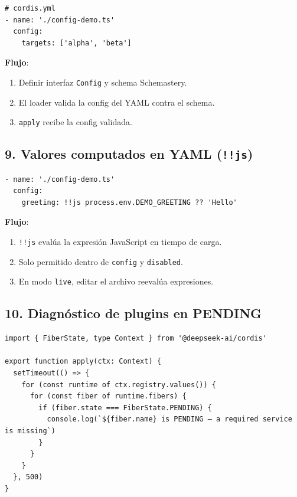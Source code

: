 \documentclass[11pt,a4paper]{article}
\begin{document}
\begin{lstlisting}
# cordis.yml
- name: './config-demo.ts'
  config:
    targets: ['alpha', 'beta']
\end{lstlisting}


\textbf{Flujo}:


\begin{enumerate}[leftmargin=*,topsep=2pt,itemsep=1pt]
  \item Definir interfaz \texttt{Config} y schema Schemastery.
  \item El loader valida la config del YAML contra el schema.
  \item \texttt{apply} recibe la config validada.
\end{enumerate}


\subsection*{9. Valores computados en YAML (\texttt{!!js})}


\begin{lstlisting}
- name: './config-demo.ts'
  config:
    greeting: !!js process.env.DEMO_GREETING ?? 'Hello'
\end{lstlisting}


\textbf{Flujo}:


\begin{enumerate}[leftmargin=*,topsep=2pt,itemsep=1pt]
  \item \texttt{!!js} evalúa la expresión JavaScript en tiempo de carga.
  \item Solo permitido dentro de \texttt{config} y \texttt{disabled}.
  \item En modo \texttt{live}, editar el archivo reevalúa expresiones.
\end{enumerate}


\subsection*{10. Diagnóstico de plugins en PENDING}


\begin{lstlisting}
import { FiberState, type Context } from '@deepseek-ai/cordis'

export function apply(ctx: Context) {
  setTimeout(() => {
    for (const runtime of ctx.registry.values()) {
      for (const fiber of runtime.fibers) {
        if (fiber.state === FiberState.PENDING) {
          console.log(`${fiber.name} is PENDING — a required service is missing`)
        }
      }
    }
  }, 500)
}
\end{lstlisting}
\end{document}
